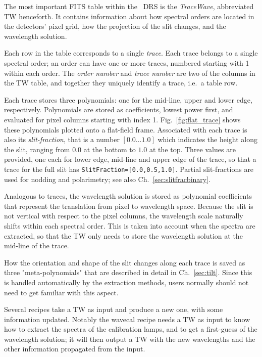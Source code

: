 The most important FITS table within the \instrument\ DRS is the
\emph{TraceWave}, abbreviated TW henceforth. It contains information about how
spectral orders are located in the detectors' pixel grid, how the projection of
the slit changes, and the wavelength solution.

Each row in the table corresponds to a single \emph{trace}. Each trace belongs
to a single spectral order; an order can have one or more traces, numbered
starting with 1 within each order. The \emph{order number} and \emph{trace
number} are two of the columns in the TW table, and together they uniquely
identify a trace, i.e.~a table row.

Each trace stores three polynomials: one for the mid-line, upper and lower edge,
respectively. Polynomials are stored as coefficients, lowest power first, and
evaluated for pixel columns starting with index 1. Fig.~\ref{fig:flat_trace}
shows these polynomials plotted onto a flat-field frame. Associated with each
trace is also its \emph{slit-fraction}, that is a number $[0.0\ldots 1.0]$ which
indicates the height along the slit, ranging from $0.0$ at the bottom to $1.0$
at the top. Three values are provided, one each for lower edge, mid-line and
upper edge of the trace, so that a trace for the full slit has
\verb!SlitFraction=[0.0,0.5,1.0]!. Partial slit-fractions are used for nodding
and polarimetry; see also Ch.~\ref{sec:slitfracbinary}.

Analogous to traces, the wavelength solution is stored as polynomial coefficients
that represent the translation from pixel to wavelength space. Because the slit
is not vertical with respect to the pixel columns, the wavelength scale
naturally shifts within each spectral order. This is taken into account when the
spectra are extracted, so that the TW only needs to store the wavelength
solution at the mid-line of the trace.

How the orientation and shape of the slit changes along each trace is saved as
three "meta-polynomials" that are described in detail in Ch.~\ref{sec:tilt}.
Since this is handled automatically by the extraction methods, users normally
should not need to get familiar with this aspect.

Several recipes take a TW as input and produce a new one, with some information
updated. Notably the wavecal recipe needs a TW as input to know how to extract
the spectra of the calibration lamps, and to get a first-guess of the
wavelength solution; it will then output a TW with the new wavelengths and
the other information propagated from the input.


